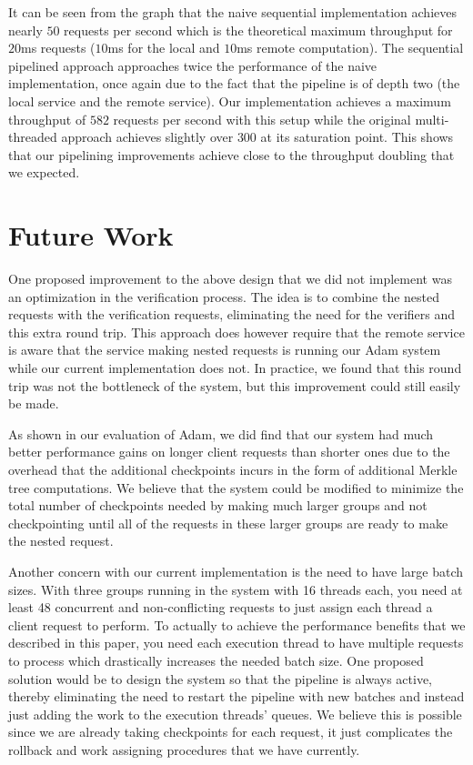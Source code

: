 \documentclass[11pt, oneside]{report}
\begin{document}
It can be seen from the graph that the naive sequential implementation achieves nearly $50$ requests per second which is the theoretical maximum throughput for $20$ms requests ($10$ms for the local and $10$ms remote computation). 
The sequential pipelined approach approaches twice the performance of the naive implementation, once again due to the fact that the pipeline is of depth two (the local service and the remote service). 
Our implementation achieves a maximum throughput of $582$ requests per second with this setup while the original multi-threaded approach achieves slightly over $300$ at its saturation point. 
This shows that our pipelining improvements achieve close to the throughput doubling that we expected.

\chapter{Future Work}

One proposed improvement to the above design that we did not implement was an optimization in the verification process.
The idea is to combine the nested requests with the verification requests, eliminating the need for the verifiers and this extra round trip.
This approach does however require that the remote service is aware that the service making nested requests is running our Adam system while our current implementation does not. 
In practice, we found that this round trip was not the bottleneck of the system, but this improvement could still easily be made.

As shown in our evaluation of Adam, we did find that our system had much better performance gains on longer client requests than shorter ones due to the overhead that the additional checkpoints incurs in the form of additional Merkle tree computations. 
We believe that the system could be modified to minimize the total number of checkpoints needed by making much larger groups and not checkpointing until all of the requests in these larger groups are ready to make the nested request.

Another concern with our current implementation is the need to have large batch sizes. With three groups running in the system with 16 threads each, you need at least 48 concurrent and non-conflicting requests to just assign each thread a client request to perform. To actually to achieve the performance benefits that we described in this paper, you need each execution thread to have multiple requests to process which drastically increases the needed batch size. One proposed solution would be to design the system so that the pipeline is always active, thereby eliminating the need to restart the pipeline with new batches and instead just adding the work to the execution threads' queues. We believe this is possible since we are already taking checkpoints for each request, it just complicates the rollback and work assigning procedures that we have currently.
\end{document}
